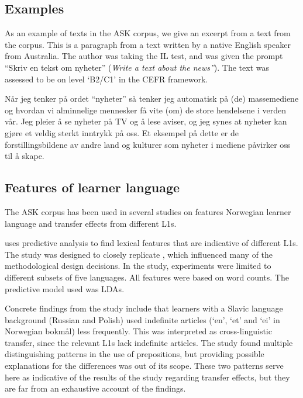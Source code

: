 \subsection{Examples}

As an example of texts in the ASK corpus, we give an excerpt from a text from
the corpus. This is a paragraph from a text written by a native English
speaker from Australia. The author was taking the IL test, and was given the
prompt ``Skriv en tekst om nyheter'' (\emph{Write a text about the news''}).
The text was assessed to be on level `B2/C1' in the CEFR framework.

\begin{displayquote}  %
  Når jeg tenker på ordet ``nyheter'' så tenker jeg automatisk på (de)
  massemediene og hvordan vi alminnelige mennesker få vite (om) de store
  hendelsene i verden vår. Jeg pleier å se nyheter på TV og å lese aviser, og
  jeg synes at nyheter kan gjøre et veldig sterkt inntrykk på oss. Et
  eksempel på dette er de forstillingsbildene av andre land og kulturer som
  nyheter i mediene påvirker oss til å skape.
\end{displayquote}


\subsection{Features of learner language}

The ASK corpus has been used in several studies on features Norwegian learner
language and transfer effects from different \acp{L1}.

\textcite{pepper2012} uses predictive analysis to find lexical features that
are indicative of different \acp{L1}. The study was designed to closely
replicate \textcite{jarvis}, which influenced many of the methodological
design decisions. In the study, experiments were limited to different subsets
of five languages. All features were based on word counts. The predictive
model used was \acp{LDA}.

Concrete findings from the \citeauthor{pepper2012} study include that
learners with a Slavic language background (Russian and Polish) used
indefinite articles (`en', `et' and `ei' in Norwegian bokmål) less
frequently. This was interpreted as cross-linguistic transfer, since the
relevant \acp{L1} lack indefinite articles. The study found multiple
distinguishing patterns in the use of prepositions, but providing possible
explanations for the differences was out of its scope. These two patterns
serve here as indicative of the results of the study regarding transfer
effects, but they are far from an exhaustive account of the findings.

